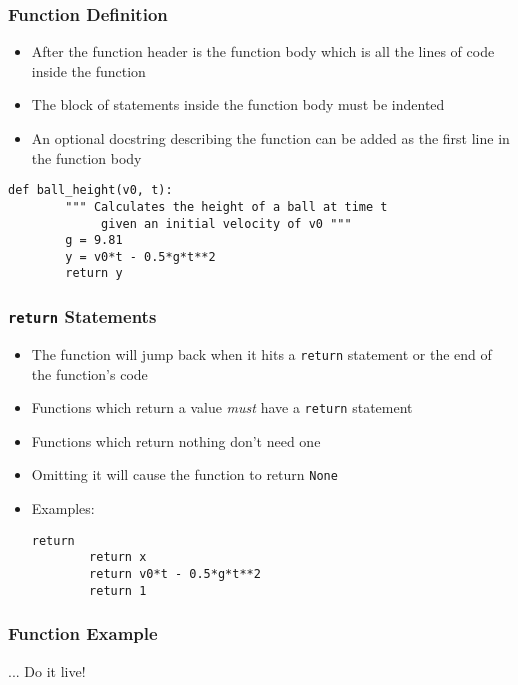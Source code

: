 \documentclass[english,14pt]{beamer}
\begin{document}
\begin{frame}[fragile]
\frametitle{Function Definition}
\begin{itemize}
    \item After the function header is the function body which is all the lines of code inside the function
    \item The block of statements inside the function body must be indented  
    \item An optional docstring describing the function can be added as the first line in the function body
\end{itemize}
\begin{lstlisting}[style=CStyle]
       def ball_height(v0, t):       
        """ Calculates the height of a ball at time t
             given an initial velocity of v0 """
        g = 9.81                    
        y = v0*t - 0.5*g*t**2
        return y                    
\end{lstlisting}
\end{frame}

\begin{frame}[fragile]
\frametitle{\texttt{return} Statements}
\begin{itemize}
    \item The function will jump back when it hits a \texttt{return} statement or the end of the function's code
	\item Functions which return a value \textit{must} have a \texttt{return} statement
	\item Functions which return nothing don't need one
	\item Omitting it will cause the function to return \texttt{None}
    \item Examples:
    \begin{lstlisting}[style=CStyle] 
        return  
        return x          
        return v0*t - 0.5*g*t**2 
        return 1          
    \end{lstlisting} %
\end{itemize}
\end{frame}


\begin{frame}
\frametitle{Function Example}
\begin{center}
... Do it live!
\end{center}
\end{frame}
\end{document}
